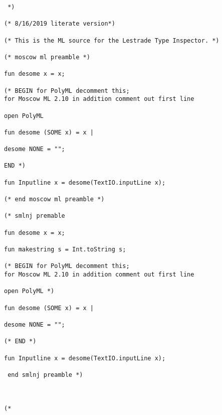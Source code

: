 \documentclass{article}
\begin{document}
\begin{verbatim} *)

(* 8/16/2019 literate version*)

(* This is the ML source for the Lestrade Type Inspector. *)

(* moscow ml preamble *)

fun desome x = x;

(* BEGIN for PolyML decomment this; 
for Moscow ML 2.10 in addition comment out first line

open PolyML

fun desome (SOME x) = x |

desome NONE = "";

END *)

fun Inputline x = desome(TextIO.inputLine x);

(* end moscow ml preamble *)

(* smlnj premable 

fun desome x = x;

fun makestring s = Int.toString s;

(* BEGIN for PolyML decomment this; 
for Moscow ML 2.10 in addition comment out first line

open PolyML *)

fun desome (SOME x) = x |

desome NONE = "";

(* END *)

fun Inputline x = desome(TextIO.inputLine x);

 end smlnj preamble *)



(*

\end{verbatim}
\end{document}
